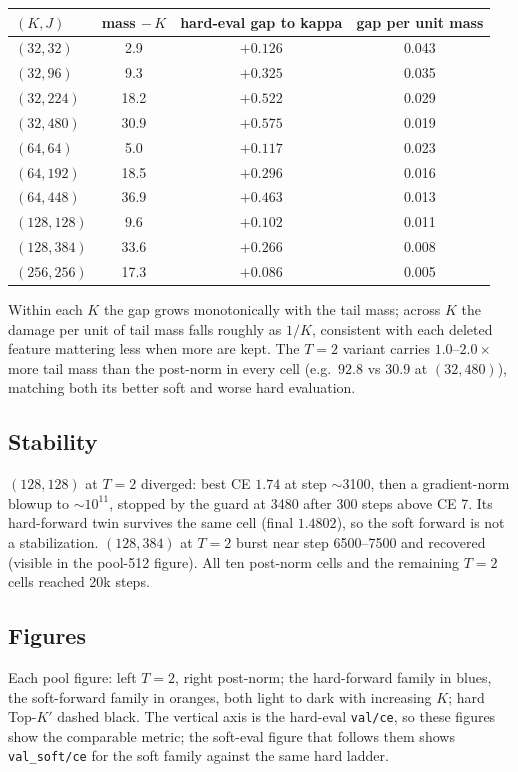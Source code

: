 \documentclass[11pt,a4paper]{article}
\newcommand{\code}[1]{\texttt{#1}}
\newcommand{\Kp}{K'}
\begin{document}
\begin{center}\small
\begin{tabular}{lccc}
\toprule
$(K,J)$ & mass $-\,K$ & hard-eval gap to kappa & gap per unit mass \\
\midrule
$(32,32)$   & 2.9  & $+0.126$ & 0.043 \\
$(32,96)$   & 9.3  & $+0.325$ & 0.035 \\
$(32,224)$  & 18.2 & $+0.522$ & 0.029 \\
$(32,480)$  & 30.9 & $+0.575$ & 0.019 \\
$(64,64)$   & 5.0  & $+0.117$ & 0.023 \\
$(64,192)$  & 18.5 & $+0.296$ & 0.016 \\
$(64,448)$  & 36.9 & $+0.463$ & 0.013 \\
$(128,128)$ & 9.6  & $+0.102$ & 0.011 \\
$(128,384)$ & 33.6 & $+0.266$ & 0.008 \\
$(256,256)$ & 17.3 & $+0.086$ & 0.005 \\
\bottomrule
\end{tabular}
\end{center}

Within each $K$ the gap grows monotonically with the tail mass; across $K$
the damage per unit of tail mass falls roughly as $1/K$, consistent with each
deleted feature mattering less when more are kept. The $T=2$ variant carries
$1.0$--$2.0\times$ more tail mass than the post-norm in every cell (e.g.\
$92.8$ vs $30.9$ at $(32,480)$), matching both its better soft and worse hard
evaluation.

\subsection*{Stability}

$(128,128)$ at $T=2$ diverged: best CE $1.74$ at step $\sim$3100, then a
gradient-norm blowup to $\sim 10^{11}$, stopped by the guard at 3480 after
300 steps above CE 7. Its hard-forward twin survives the same cell (final
$1.4802$), so the soft forward is not a stabilization. $(128,384)$ at $T=2$
burst near step 6500--7500 and recovered (visible in the pool-512 figure).
All ten post-norm cells and the remaining $T=2$ cells reached 20k steps.

\subsection*{Figures}

Each pool figure: left $T=2$, right post-norm; the hard-forward family in
blues, the soft-forward family in oranges, both light to dark with increasing
$K$; hard Top-$\Kp$ dashed black. The vertical axis is the hard-eval
\code{val/ce}, so these figures show the comparable metric; the soft-eval
figure that follows them shows \code{val\_soft/ce} for the soft family
against the same hard ladder.
\end{document}
